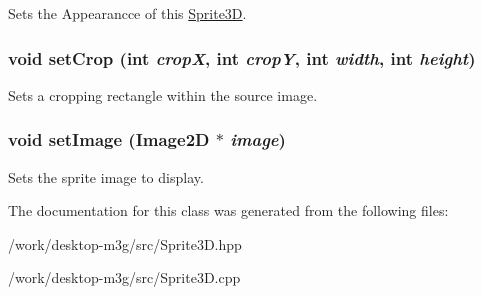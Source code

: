 Sets the Appearancce of this \hyperlink{classm3g_1_1Sprite3D}{Sprite3D}. \hypertarget{classm3g_1_1Sprite3D_92660f9625c68b0169ee84bbc4586187}{
\subsubsection[{setCrop}]{\setlength{\rightskip}{0pt plus 5cm}void setCrop (int {\em cropX}, \/  int {\em cropY}, \/  int {\em width}, \/  int {\em height})}}
\label{classm3g_1_1Sprite3D_92660f9625c68b0169ee84bbc4586187}


Sets a cropping rectangle within the source image. \hypertarget{classm3g_1_1Sprite3D_705b89b41cd1b38f664ed912be44baaa}{
\subsubsection[{setImage}]{\setlength{\rightskip}{0pt plus 5cm}void setImage ({\bf Image2D} $\ast$ {\em image})}}
\label{classm3g_1_1Sprite3D_705b89b41cd1b38f664ed912be44baaa}


Sets the sprite image to display. 

The documentation for this class was generated from the following files:\begin{CompactItemize}
\item 
/work/desktop-m3g/src/Sprite3D.hpp\item 
/work/desktop-m3g/src/Sprite3D.cpp\end{CompactItemize}
